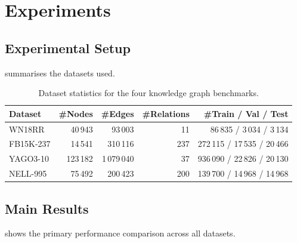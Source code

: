 \documentclass[
    language=english,
    doctype=article,
    institution=none,
]{../../omnilatex}
\theoremstyle{definition}
\theoremstyle{definition}
\theoremstyle{remark}
\begin{document}
\section{Experiments}
\label{sec:experiments}

\subsection{Experimental Setup}

 summarises the datasets used.

\begin{table}[htbp]
    \centering
    \caption{Dataset statistics for the four knowledge graph benchmarks.}
    \label{tab:setup}
    \begin{tabular}{@{}lrrrr@{}}
        \toprule
        \textbf{Dataset}
            & \textbf{\#Nodes}
            & \textbf{\#Edges}
            & \textbf{\#Relations}
            & \textbf{\#Train / Val / Test} \\
        \midrule
        WN18RR   & 40\,943   & 93\,003   & 11 & 86\,835 / 3\,034 / 3\,134 \\
        FB15K-237 & 14\,541  & 310\,116  & 237 & 272\,115 / 17\,535 / 20\,466 \\
        YAGO3-10 & 123\,182 & 1\,079\,040 & 37 & 936\,090 / 22\,826 / 20\,130 \\
        NELL-995 & 75\,492  & 200\,423  & 200 & 139\,700 / 14\,968 / 14\,968 \\
        \bottomrule
    \end{tabular}
\end{table}

\subsection{Main Results}

 shows the primary performance comparison across
all datasets.
\end{document}
